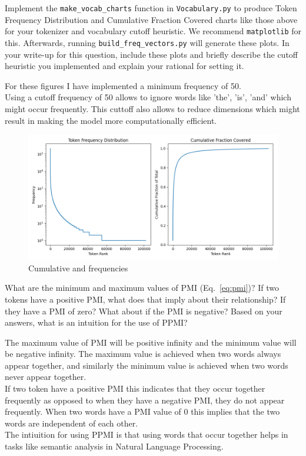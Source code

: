 \documentclass[a4paper,10pt]{article}
\begin{document}
\vspace{5pt}
\begin{taskbox}
 Implement the \texttt{make\_vocab\_charts} function in \texttt{Vocabulary.py} to produce Token Frequency Distribution and Cumulative Fraction Covered charts like those above for your tokenizer and vocabulary cutoff heuristic. We recommend \texttt{matplotlib} for this. Afterwards, running \texttt{build\_freq\_vectors.py} will generate these plots. In your write-up for this question, include these plots and briefly describe the cutoff heuristic you implemented and explain your rational for setting it. 
\end{taskbox}
\begin{answerbox}
    For these figures I have implemented a minimum frequency of 50.\\
    Using a cutoff frequency of 50 allows to ignore words like 'the', 'is', 'and' which might occur frequently. This cuttoff also allows to reduce dimensions which might result in making the model more computationally efficient.
\end{answerbox}
\begin{figure}[h]
    \centering
    \includegraphics[width=0.5\linewidth]{cumulative_and_freq.png}
    \caption{Cumulative and frequencies}
    \label{fig:enter-label}
\end{figure}
\vspace{5pt}

\vspace{5pt}
\begin{taskbox}
 What are the minimum and maximum values of PMI (Eq.~\ref{eq:pmi})? If two tokens have a positive PMI, what does that imply about their relationship? If they have a PMI of zero? What about if the PMI is negative? Based on your answers, what is an intuition for the use of PPMI?
\end{taskbox}
\begin{answerbox}
    The maximum value of PMI will be positive infinity and the minimum value will be negative infinity. The maximum value is achieved when two words always appear together, and similarly the minimum value is achieved when two words never appear together.\\
    If two token have a positive PMI this indicates that they occur together frequently as opposed to when they have a negative PMI, they do not appear frequently. When two words have a PMI value of $0$ this implies that the two words are independent of each other.\\
    The intiuition for using PPMI is that using words that occur together helps in tasks like semantic analysis in Natural Language Processing.
\end{answerbox}
\vspace{5pt}
\end{document}

